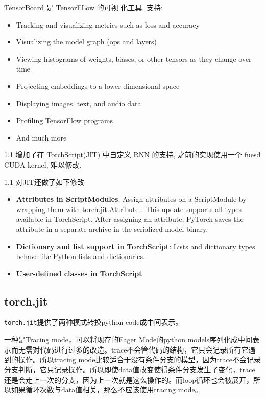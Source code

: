 \href{https://www.tensorflow.org/tensorboard/}{TensorBoard} 是 TensorFLow 的可视
化工具. 支持:
\begin{itemize}
\item
Tracking and visualizing metrics such as loss and accuracy
\item
Visualizing the model graph (ops and layers)
\item
Viewing histograms of weights, biases, or other tensors as they change over time
\item
Projecting embeddings to a lower dimensional space
\item
Displaying images, text, and audio data
\item
Profiling TensorFlow programs
\item
And much more
\end{itemize}

1.1 增加了在 TorchScript(JIT) 中\href{https://pytorch.org/blog/optimizing-cuda-rnn-with-torchscript/}
{自定义 RNN 的支持}, 之前的实现使用一个 fuesd CUDA kernel, 难以修改.

1.1 对JIT还做了如下修改
\begin{itemize}
\item
\textbf{Attributes in ScriptModules}: Assign attributes on a ScriptModule by wrapping them with torch.jit.Attribute . This update supports all types available in TorchScript. After assigning an attribute, PyTorch saves the attribute in a separate archive in the serialized model binary.
\item
\textbf{Dictionary and list support in TorchScript}: Lists and dictionary types behave like Python lists and dictionaries.
\item
\textbf{User-defined classes in TorchScript}
\end{itemize}


\subsection{torch.jit}

\texttt{torch.jit}提供了两种模式转换python code成中间表示。

一种是Tracing mode，可以将现存的Eager Mode的python models序列化成中间表示而无需对代码进行过多的改造。trace不会管代码的结构，它只会记录所有它遇到的操作。所以tracing mode比较适合于没有条件分支的模型，因为trace不会记录分支判断，它只记录操作。所以即使data值改变使得条件分支发生了变化，trace还是会走上一次的分支，因为上一次就是这么操作的。而loop循环也会被展开，所以如果循环次数与data值相关，那么不应该使用tracing mode。

